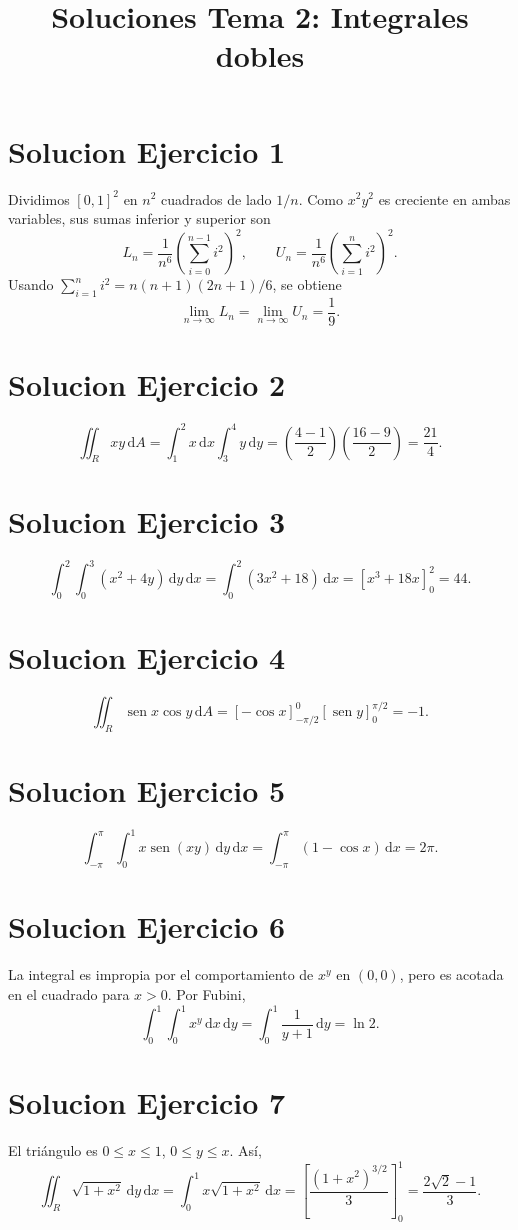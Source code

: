 \documentclass[11pt,a4paper]{article}
\title{Soluciones Tema 2: Integrales dobles}
\author{}
\date{}
\DeclareMathOperator{\sen}{sen}
\newcommand{\dd}{\,\mathrm{d}}
\begin{document}
\maketitle

\section{Solucion Ejercicio 1}
Dividimos $[0,1]^2$ en $n^2$ cuadrados de lado $1/n$. Como $x^2y^2$ es creciente en ambas variables, sus sumas inferior y superior son
\[L_n=\frac1{n^6}\left(\sum_{i=0}^{n-1}i^2\right)^2,\qquad U_n=\frac1{n^6}\left(\sum_{i=1}^{n}i^2\right)^2.\]
Usando $\sum_{i=1}^n i^2=n(n+1)(2n+1)/6$, se obtiene
\[\lim_{n\to\infty}L_n=\lim_{n\to\infty}U_n=\boxed{\frac19}.\]

\section{Solucion Ejercicio 2}
\[\iint_R xy\dd A=\int_1^2 x\dd x\int_3^4 y\dd y=(\frac{4-1}{2})(\frac{16-9}{2})=\boxed{\frac{21}{4}}.\]

\section{Solucion Ejercicio 3}
\[\int_0^2\int_0^3(x^2+4y)\dd y\dd x=\int_0^2(3x^2+18)\dd x=[x^3+18x]_0^2=\boxed{44}.\]

\section{Solucion Ejercicio 4}
\[\iint_R\sen x\cos y\dd A=\left[ -\cos x\right]_{-\pi/2}^0\left[\sen y\right]_0^{\pi/2}=\boxed{-1}.\]

\section{Solucion Ejercicio 5}
\[\int_{-\pi}^{\pi}\int_0^1 x\sen(xy)\dd y\dd x=\int_{-\pi}^{\pi}(1-\cos x)\dd x=\boxed{2\pi}.\]

\section{Solucion Ejercicio 6}
La integral es impropia por el comportamiento de $x^y$ en $(0,0)$, pero es acotada en el cuadrado para $x>0$. Por Fubini,
\[\int_0^1\int_0^1 x^y\dd x\dd y=\int_0^1\frac1{y+1}\dd y=\boxed{\ln 2}.\]

\section{Solucion Ejercicio 7}
El triángulo es $0\le x\le1$, $0\le y\le x$. Así,
\[\iint_R\sqrt{1+x^2}\dd y\dd x=\int_0^1 x\sqrt{1+x^2}\dd x=\left[\frac{(1+x^2)^{3/2}}3\right]_0^1=\boxed{\frac{2\sqrt2-1}{3}}.\]
\end{document}
